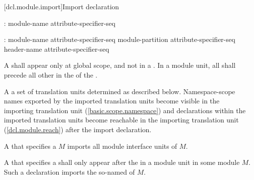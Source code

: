 [dcl.module.import]{Import declaration}%

\begin{std.txt}\color{addclr}
\begin{before}
  \begin{bnf}\color{addclr}
    :\br
       module-name attribute-specifier-seq\opt {} \terminal{;}
  \end{bnf}
\end{before}\begin{after}
  \begin{bnf}\color{addclr}
    :\br
      \opt{}  module-name attribute-specifier-seq\opt {} \terminal{;}\br
      \opt{}  module-partition attribute-specifier-seq\opt {} \terminal{;}\br
      \opt{}  header-name attribute-specifier-seq\opt {} \terminal{;}
  \end{bnf}
\end{after}

  \resetalinea[0]
  \alinea
  A  shall appear only at
  global scope, and not in a .
  In a module unit, all 
  shall precede all other  in
  the  of the
  .

  \alinea
  A   a set of
  translation units determined as described below.
  \enternote
  Namespace-scope names exported by the imported translation units
  become visible in the importing translation unit (\ref{basic.scope.namespace})
  and declarations within the imported translation units become reachable
  in the importing translation unit (\ref{dcl.module.reach})
  after the import declaration.
  \exitnote

  \alinea
  A  that specifies
  a  $M$
  imports all module interface units of $M$.

  \alinea
  A  that specifies
  a  shall only appear after
  the  in a module unit in
  some module $M$.
  Such a declaration imports the so-named
   of $M$.


\end{std.txt}
